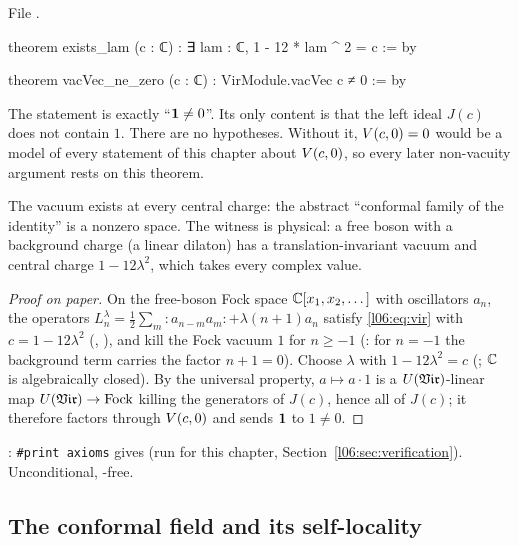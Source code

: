 File .
\begin{leancode}
theorem exists_lam (c : ℂ) : ∃ lam : ℂ, 1 - 12 * lam ^ 2 = c := by

theorem vacVec_ne_zero (c : ℂ) : VirModule.vacVec c ≠ 0 := by
\end{leancode}

\begin{dictionary}
The statement is exactly ``$\mathbf{1}\ne0$''. Its only content is that the left ideal $J(c)$ does not
contain $1$. There are no hypotheses. Without it, $V(c,0) = 0$ would be a model of every statement of
this chapter about $V(c,0)$, so every later non-vacuity argument rests on this theorem.
\end{dictionary}

\begin{physics}
The vacuum exists at every central charge: the abstract ``conformal family of the identity'' is a
nonzero space. The witness is physical: a free boson with a background charge (a linear dilaton) has
a translation-invariant vacuum and central charge $1-12\lambda^2$, which takes every complex value.
\end{physics}

\begin{proof}[Proof on paper]
On the free-boson Fock space ${\mathbb{C}}[x_1,x_2,\dots]$ with oscillators $a_n$, the operators
$L^\lambda_n = \frac12\sum_m{:}a_{n-m}a_m{:}+\lambda(n+1)a_n$ satisfy \eqref{l06:eq:vir} with
$c = 1-12\lambda^2$ (, ), and kill the Fock vacuum $1$ for
$n\ge-1$ (: for $n=-1$ the background term carries the factor $n+1 = 0$). Choose
$\lambda$ with $1-12\lambda^2 = c$ (; ${\mathbb{C}}$ is algebraically closed). By the universal
property, $a\mapsto a\cdot1$ is a $U(\mathfrak{Vir})$-linear map $U(\mathfrak{Vir})\to\mathrm{Fock}$ killing the generators of
$J(c)$, hence all of $J(c)$; it therefore factors through $V(c,0)$ and sends $\mathbf{1}$ to $1\ne0$.
\end{proof}

\begin{status}
: \texttt{\#print axioms} gives \lean{[propext, Classical.}\allowbreak{}\allowbreak\lean{sound]}
(run for this chapter, Section~\ref{l06:sec:verification}). Unconditional, -free.
\end{status}

\subsection{The conformal field and its self-locality}

